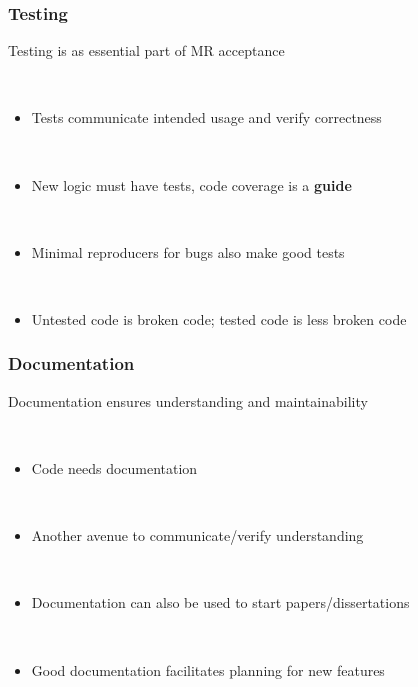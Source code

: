 \documentclass{beamer}
\begin{document}

\begin{frame}
\begin{center}
\frametitle{Testing}

Testing is as essential part of MR acceptance

~\\

\begin{itemize}

\item Tests communicate intended usage and verify correctness

~\\

\item New logic must have tests, code coverage is a \textbf{guide}

~\\

\item Minimal reproducers for bugs also make good tests

~\\

\item Untested code is broken code; tested code is less broken code\\

\end{itemize}

\end{center}
\end{frame}


\begin{frame}
\begin{center}
\frametitle{Documentation}

Documentation ensures understanding and maintainability

~\\

\begin{itemize}

\item Code needs documentation

~\\

\item Another avenue to communicate/verify understanding

~\\

\item Documentation can also be used to start papers/dissertations

~\\

\item Good documentation facilitates planning for new features

\end{itemize}

\end{center}
\end{frame}
\end{document}
